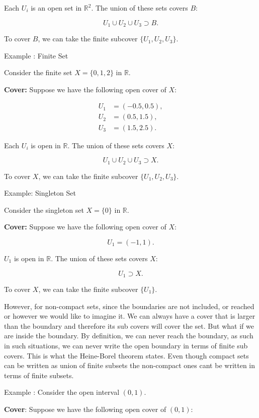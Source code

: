 \documentclass{article}
\begin{document}
Each \(U_i\) is an open set in \(\mathbb{R}^2\). The union of these sets covers \(B\):

\[
U_1 \cup U_2 \cup U_3 \supset B.
\]

To cover \(B\), we can take the finite subcover \(\{U_1, U_2, U_3\}\).

Example : Finite Set

Consider the finite set \(X = \{0, 1, 2\}\) in \(\mathbb{R}\).

\textbf{Cover:} Suppose we have the following open cover of \(X\):

\[
\begin{aligned}
U_1 &= (-0.5, 0.5), \\
U_2 &= (0.5, 1.5), \\
U_3 &= (1.5, 2.5).
\end{aligned}
\]

Each \(U_i\) is open in \(\mathbb{R}\). The union of these sets covers \(X\):

\[
U_1 \cup U_2 \cup U_3 \supset X.
\]

To cover \(X\), we can take the finite subcover \(\{U_1, U_2, U_3\}\).

Example: Singleton Set

Consider the singleton set \(X = \{0\}\) in \(\mathbb{R}\).

\textbf{Cover:} Suppose we have the following open cover of \(X\):

\[
U_1 = (-1, 1).
\]

\(U_1\) is open in \(\mathbb{R}\). The union of these sets covers \(X\):

\[
U_1 \supset X.
\]

To cover \(X\), we can take the finite subcover \(\{U_1\}\).


However, for non-compact sets, since the boundaries are not included, or reached or however we would like to imagine it. We can always have a cover that is larger than the boundary and therefore its sub covers will cover the set. But what if we are inside the boundary. By definition, we can never reach the boundary, as such in such situations, we can never write the open boundary in terms of finite sub covers. This is what the Heine-Borel theorem states. Even though compact sets can be written as union of finite subsets the non-compact ones cant be written in terms of finite subsets. 


Example : Consider the open interval \((0, 1)\).

\textbf{Cover}: Suppose we have the following open cover of \((0, 1)\):
\end{document}
